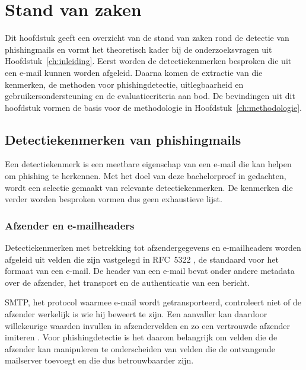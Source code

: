 
\chapter{Stand van zaken}%
\label{ch:stand-van-zaken}

Dit hoofdstuk geeft een overzicht van de stand van zaken rond de detectie van phishingmails en vormt het theoretisch kader bij de onderzoeksvragen uit Hoofdstuk~\ref{ch:inleiding}. Eerst worden de detectiekenmerken besproken die uit een e-mail kunnen worden afgeleid. Daarna komen de extractie van die kenmerken, de methoden voor phishingdetectie, uitlegbaarheid en gebruikersondersteuning en de evaluatiecriteria aan bod. De bevindingen uit dit hoofdstuk vormen de basis voor de methodologie in Hoofdstuk~\ref{ch:methodologie}.

\section{Detectiekenmerken van phishingmails}%
\label{sec:kenmerken-detectie}

Een detectiekenmerk is een meetbare eigenschap van een e-mail die kan helpen om phishing te herkennen. Met het doel van deze bachelorproef in gedachten, wordt een selectie gemaakt van relevante detectiekenmerken. De kenmerken die verder worden besproken vormen dus geen exhaustieve lijst.

\subsection{Afzender en e-mail\-headers}%
\label{subsec:afzender-headers}

Detectiekenmerken met betrekking tot afzendergegevens en e-mailheaders worden afgeleid uit velden die zijn vastgelegd in RFC~5322 \autocite{Resnick2008}, de standaard voor het formaat van een e-mail. De header van een e-mail bevat onder andere metadata over de afzender, het transport en de authenticatie van een bericht.

SMTP, het protocol waarmee e-mail wordt getransporteerd, controleert niet of de afzender werkelijk is wie hij beweert te zijn. Een aanvaller kan daardoor willekeurige waarden invullen in afzendervelden en zo een vertrouwde afzender imiteren \autocite{Hu2018}. Voor phishingdetectie is het daarom belangrijk om velden die de afzender kan manipuleren te onderscheiden van velden die de ontvangende mailserver toevoegt en die dus betrouwbaarder zijn.

